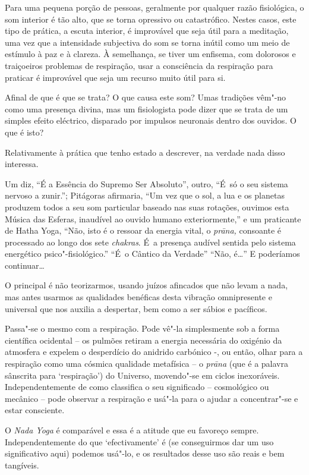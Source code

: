 Para uma pequena porção de pessoas, geralmente por qualquer razão
fisiológica, o som interior é tão alto, que se torna opressivo ou
catastrófico. Nestes casos, este tipo de prática, a escuta interior, é
improvável que seja útil para a meditação, uma vez que a intensidade
subjectiva do som se torna inútil como um meio de estímulo à paz e à
clareza. À semelhança, se tiver um enfisema, com dolorosos e traiçoeiros
problemas de respiração, usar a consciência da respiração para praticar
é improvável que seja um recurso muito útil para si.

\smallskip

 Afinal de que é que se trata? O que causa este som? Umas tradições
vêm"-no como uma presença divina, mas um fisiologista pode dizer que se
trata de um simples efeito eléctrico, disparado por impulsos neuronais
dentro dos ouvidos. O que é isto?

 Relativamente à prática que tenho estado a descrever, na verdade nada
disso interessa.

Um diz, ``É a Essência do Supremo Ser Absoluto'', outro, ``É~só o seu
sistema nervoso a zunir.''; Pitágoras afirmaria, ``Um vez que o sol, a
lua e os planetas produzem todos a seu som particular baseado nas suas
rotações, ouvimos esta Música das Esferas, inaudível ao ouvido humano
exteriormente,'' e um praticante de Hatha Yoga, ``Não, isto é o ressoar
da energia vital, o \emph{prāna,} consoante é processado ao longo dos
sete \emph{chakras}. É~a presença audível sentida pelo sistema
energético psico"-fisiológico.'' ``É~o Cântico da Verdade'' ``Não,
é\ldots{}'' E poderíamos continuar\ldots{}

O principal é não teorizarmos, usando juízos afincados que não levam a
nada, mas antes usarmos as qualidades benéficas desta vibração
omnipresente e universal que nos auxilia a despertar, bem como a ser
sábios e pacíficos.

Passa"-se o mesmo com a respiração. Pode vê"-la simplesmente sob a forma
científica ocidental -- os pulmões retiram a energia necessária do
oxigénio da atmosfera e expelem o desperdício do anidrido carbónico -,
ou então, olhar para a respiração como uma cósmica qualidade metafísica
-- o \emph{prāna} (que é a palavra sânscrita para `respiração') do
Universo, movendo"-se em ciclos inexoráveis. Independentemente de como
classifica o seu significado -- cosmológico ou mecânico -- pode observar
a respiração e usá"-la para o ajudar a concentrar"-se e estar consciente.

O \emph{Nada Yoga} é comparável e essa é a atitude que eu favoreço
sempre. Independentemente do que `efectivamente' é (se conseguirmos dar
um uso significativo aqui) podemos usá"-lo, e os resultados desse uso são
reais e bem tangíveis.

